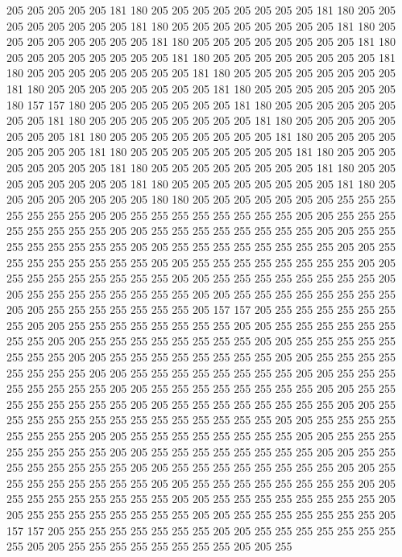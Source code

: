 205 205 205 205 205 181 180 205 205 205 205 205 205 205 205 181 180 205 205 205
205 205 205 205 205 181 180 205 205 205 205 205 205 205 205 181 180 205 205 205
205 205 205 205 205 181 180 205 205 205 205 205 205 205 205 181 180 205 205 205
205 205 205 205 205 181 180 205 205 205 205 205 205 205 205 181 180 205 205 205
205 205 205 205 205 181 180 205 205 205 205 205 205 205 205 181 180 205 205 205
205 205 205 205 205 181 180 205 205 205 205 205 205 205 180 157 157 180 205 205
205 205 205 205 205 181 180 205 205 205 205 205 205 205 205 181 180 205 205 205
205 205 205 205 205 181 180 205 205 205 205 205 205 205 205 181 180 205 205 205
205 205 205 205 205 181 180 205 205 205 205 205 205 205 205 181 180 205 205 205
205 205 205 205 205 181 180 205 205 205 205 205 205 205 205 181 180 205 205 205
205 205 205 205 205 181 180 205 205 205 205 205 205 205 205 181 180 205 205 205
205 205 205 205 205 181 180 205 205 205 205 205 205 205 205 180 180 205 205 205
205 205 205 205 255 255 255 255 255 255 255 205 205 255 255 255 255 255 255 255
255 205 205 255 255 255 255 255 255 255 255 205 205 255 255 255 255 255 255 255
255 205 205 255 255 255 255 255 255 255 255 205 205 255 255 255 255 255 255 255
255 205 205 255 255 255 255 255 255 255 255 205 205 255 255 255 255 255 255 255
255 205 205 255 255 255 255 255 255 255 255 205 205 255 255 255 255 255 255 255
255 205 205 255 255 255 255 255 255 255 255 205 205 255 255 255 255 255 255 255
255 205 205 255 255 255 255 255 255 255 205 157 157 205 255 255 255 255 255 255
255 205 205 255 255 255 255 255 255 255 255 205 205 255 255 255 255 255 255 255
255 205 205 255 255 255 255 255 255 255 255 205 205 255 255 255 255 255 255 255
255 205 205 255 255 255 255 255 255 255 255 205 205 255 255 255 255 255 255 255
255 205 205 255 255 255 255 255 255 255 255 205 205 255 255 255 255 255 255 255
255 205 205 255 255 255 255 255 255 255 255 205 205 255 255 255 255 255 255 255
255 205 205 255 255 255 255 255 255 255 255 205 205 255 255 255 255 255 255 255
255 255 255 255 255 255 255 205 205 255 255 255 255 255 255 255 255 205 205 255
255 255 255 255 255 255 255 205 205 255 255 255 255 255 255 255 255 205 205 255
255 255 255 255 255 255 255 205 205 255 255 255 255 255 255 255 255 205 205 255
255 255 255 255 255 255 255 205 205 255 255 255 255 255 255 255 255 205 205 255
255 255 255 255 255 255 255 205 205 255 255 255 255 255 255 255 255 205 205 255
255 255 255 255 255 255 255 205 205 255 255 255 255 255 255 255 255 205 205 255
255 255 255 255 255 255 205 157 157 205 255 255 255 255 255 255 255 205 205 255
255 255 255 255 255 255 255 205 205 255 255 255 255 255 255 255 255 205 205 255
